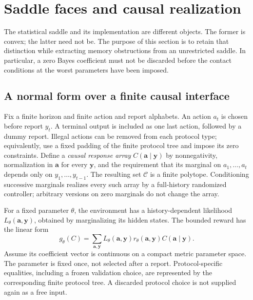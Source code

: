 \section{Saddle faces and causal realization}
\label{sec:saddle-realization}
The statistical saddle and its implementation are different objects.
The former is convex; the latter need not be. The purpose of this section
is to retain that distinction while extracting memory obstructions from
an unrestricted saddle. In particular, a zero Bayes coefficient must not
be discarded before the contact conditions at the worst parameters have
been imposed.

\subsection{A normal form over a finite causal interface}
Fix a finite horizon and finite action and report alphabets. An action
$a_t$ is chosen before report $y_t$. A terminal output is included as one
last action, followed by a dummy report. Illegal actions can be removed
from each protocol type; equivalently, use a fixed padding of the finite
protocol tree and impose its zero constraints. Define a \emph{causal
response array} $C(\mathbf a\mid\mathbf y)$ by nonnegativity,
normalization in $\mathbf a$ for every $\mathbf y$, and the requirement
that its marginal on $a_1,\ldots,a_t$ depends only on
$y_1,\ldots,y_{t-1}$. The resulting set $\mathcal C$ is a finite
polytope. Conditioning successive marginals realizes every such array
by a full-history randomized controller; arbitrary versions on zero
marginals do not change the array.

For a fixed parameter $\theta$, the environment has a history-dependent
likelihood $L_\theta(\mathbf a,\mathbf y)$, obtained by marginalizing
its hidden states. The bounded reward has the linear form
\begin{equation}\label{eq:strategic-payoff}
 g_\theta(C)=\sum_{\mathbf a,\mathbf y}
 L_\theta(\mathbf a,\mathbf y)r_\theta(\mathbf a,\mathbf y)
 C(\mathbf a\mid\mathbf y).
\end{equation}
Assume its coefficient vector is continuous on a compact metric
parameter space. The parameter is fixed once, not selected after a
report. Protocol-specific equalities, including a frozen validation
choice, are represented by the corresponding finite protocol tree.
A discarded protocol choice is not supplied again as a free input.

